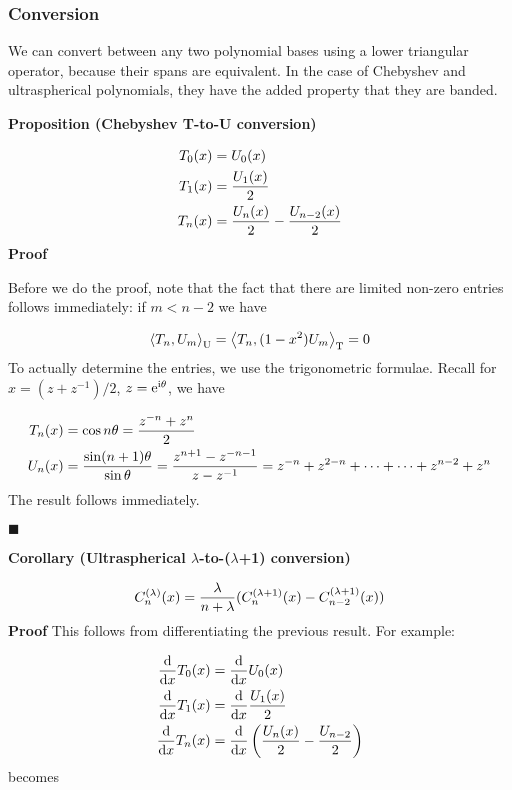 \documentclass[12pt,a4paper]{article}
\def\D{ {\rm d} }
\def\I{ {\rm i} }
\def\E{ {\rm e} }
\def\ip<#1>{\left\langle{#1}\right\rangle}
\def\dx{\D x}
\begin{document}
\subsubsection{Conversion}
We can convert between any two polynomial bases using a lower triangular operator, because their spans are equivalent. In the case of Chebyshev and ultraspherical polynomials, they have the added property that they are banded.

\textbf{Proposition (Chebyshev T-to-U conversion)}


\begin{align*}
 T_0(x) &= U_0(x) \\
 T_1(x) &= {U_1(x) \over 2} \\
 T_n(x) &= {U_n(x) \over 2} - {U_{n-2}(x) \over 2}
\end{align*}
\textbf{Proof}

Before we do the proof, note that the fact that there are limited non-zero entries follows immediately: if $m < n-2$ we have

\[
\ip<T_n, U_m>_{\rm U} = \ip<T_n, (1-x^2)U_m>_{\rm T} = 0
\]
To actually determine the entries, we use the trigonometric formulae. Recall for $x = (z + z^{-1})/2$, $z = \E^{\I \theta}$, we have


\begin{align*}
T_n(x) &= \cos n \theta = {z^{-n} + z^n \over 2}\\
U_n(x) &= {\sin (n+1) \theta \over \sin \theta} = {z^{n+1} - z^{-n-1} \over z - z^{-1}} = z^{-n} + z^{2-n} + \cdots +  \cdots + z^{n-2} + z^n
\end{align*}
The result follows immediately.

\ensuremath{\blacksquare}

\textbf{Corollary (Ultraspherical \ensuremath{\lambda}-to-(\ensuremath{\lambda}+1) conversion)}

\[
C_n^{(\lambda)}(x) = {\lambda \over n+ \lambda} (C_n^{(\lambda+1)}(x) - C_{n-2}^{(\lambda+1)}(x))
\]
\textbf{Proof} This follows from differentiating the previous result. For example:


\begin{align*}
 {\D\over \dx} T_0(x) &= {\D\over \dx} U_0(x) \\
 {\D\over \dx} T_1(x) &= {\D\over \dx} {U_1(x) \over 2} \\
{\D\over \dx} T_n(x) &= {\D\over \dx} \left({U_n(x) \over 2} - {U_{n-2} \over 2} \right)
\end{align*}
becomes
\end{document}
